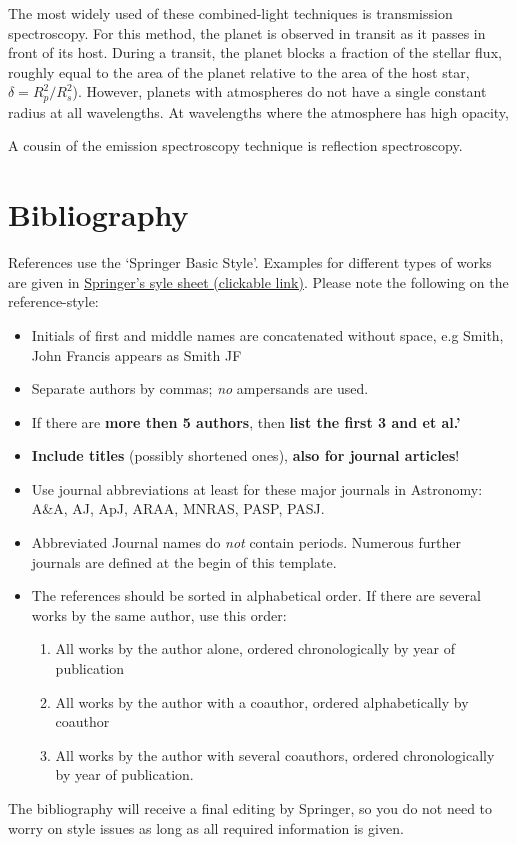 \documentclass[graybox,natbib,nosecnum]{svmult}
\begin{document}
The most widely used of these combined-light techniques is transmission spectroscopy. For this method, the planet is observed in transit as it passes in front of its host. During a transit, the planet blocks a fraction of the stellar flux, roughly equal to the area of the planet relative to the area of the host star, $\delta = R_p^2/R_s^2$). However, planets with atmospheres do not have a single constant radius at all wavelengths. At wavelengths where the atmosphere has high opacity, 


A cousin of the emission spectroscopy technique is reflection spectroscopy.


\section{Bibliography}
References use the `Springer Basic Style'. Examples for different types of works are given in \href{https://meteor.springer.com/exoplanets/?id=435&tab=About&mode=ReadPage&entity=3283}{\ul{Springer's syle sheet (clickable link)}}. 
\noindent Please note the following on the reference-style:
\begin{itemize}
\item{Initials of first and middle names are concatenated without space, e.g Smith, John Francis appears as Smith JF}
\item{Separate authors by commas; \emph{no} ampersands are used.}
\item{If there are {\bf more then 5 authors}, then {\bf list the first 3 and et al.'}}
\item{{\bf Include titles} (possibly shortened ones), {\bf also for journal articles}!  }
\item{Use journal abbreviations at least for these major journals in Astronomy: A\&A, AJ, ApJ, ARAA, MNRAS, PASP, PASJ. }
\item{Abbreviated Journal names do \emph{not} contain periods. Numerous further journals are defined at the begin of this template. }
\item{The references should be sorted in alphabetical order. If there are several works by the same author, use this order: }
\begin{enumerate}
\item All works by the author alone, ordered chronologically by year of publication
\item All works by the author with a coauthor, ordered alphabetically by coauthor
\item All works by the author with several coauthors, ordered chronologically by year of publication.
\end{enumerate}
\end{itemize}
The bibliography will receive a final editing by Springer, so you do not need to worry on style issues as long as all required information is given.
\end{document}
